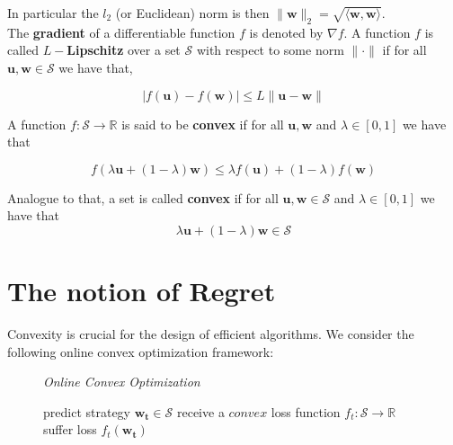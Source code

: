 In particular the $l_2$ (or Euclidean) norm is then $\|\textbf{w}\|_2 = \sqrt{\langle\textbf{w},\textbf{w}\rangle}$. \\

The \textbf{gradient} of a differentiable function $f$ is denoted by $\nabla f$. A function $f$ is called $L-$\textbf{Lipschitz} over a set $\mathcal{S}$ with respect to some norm $\|\cdot\|$ if for all $\textbf{u},\textbf{w} \in \mathcal{S}$ we have that, 

\begin{equation*}
    |f(\textbf{u}) - f(\textbf{w})| \le L\|\textbf{u} - \textbf{w}\|
\end{equation*}

A function $f:\mathcal{S} \to \mathbb{R}$ is said to be \textbf{convex} if for all $\mathbf{u,w}$ and $\lambda \in [0,1]$ we have that 

\begin{equation*}
    f(\lambda\textbf{u} + (1-\lambda)\textbf{w}) \le \lambda f(\textbf{u}) + (1-\lambda)f(\textbf{w})
\end{equation*}

Analogue to that, a set is called \textbf{convex} if for all $\mathbf{u,w} \in \mathcal{S}$ and $\lambda \in [0,1]$ we have that 
\begin{equation*}
    \lambda\mathbf{u} + (1-\lambda)\textbf{w} \in \mathcal{S} 
\end{equation*}


\section{The notion of Regret}\label{section:theNotionOfRegret}

Convexity is crucial for the design of efficient algorithms. We consider the following online convex optimization framework\cite{shalev}: \\

\begin{figure}[ht]\centering
    \textit{Online Convex Optimization}
    \begin{minipage}{.7\linewidth}
        \begin{algorithm}[H]
        \DontPrintSemicolon
         {
        predict strategy $\mathbf{w_t \in \mathcal{S}}$ \;
        receive a $convex$ loss function $f_t:\mathcal{S} \to \mathbb{R}$ \;
        suffer loss $f_t(\mathbf{w_t})$ \;
        }
        \end{algorithm}\caption*{}
  \end{minipage}
\end{figure}


